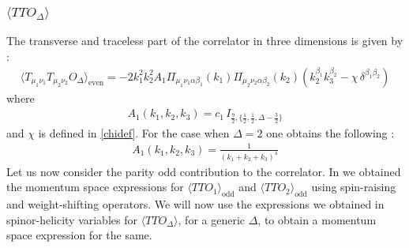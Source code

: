 \documentclass[a4paper,11pt]{article}
\begin{document}
\subsubsection*{$\langle TTO_{\Delta}\rangle$}
The transverse and traceless part of the correlator in three dimensions is given by \cite{Bzowski:2018fql}:
%
\begin{align}
 \langle T_{\mu_1 \nu_1}T_{\mu_2 \nu_2}O_{\Delta} \rangle_{\text{even}}=-2k_1^2k_2^2A_1\Pi_{\mu_1\nu_1\alpha\beta_1}(k_1)\Pi_{\mu_2\nu_2\alpha\beta_2}(k_2)(k_2^{\beta_1}k_3^{\beta_2}-\chi\,\delta^{\beta_1\beta_2})   
\end{align}
%
where
%
\begin{align}
\label{parityeventtoformfactor}
    A_1(k_1,k_2,k_3)=c_1\,I_{\frac 92,\{\frac 12,\frac 12,\Delta-\frac{3}{2}\}}
\end{align}
%
and $\chi$ is defined in \eqref{chidef}. For the case when $\Delta=2$ one obtains the following :
%
\begin{align}
A_1(k_1,k_2,k_3)=\frac{1}{(k_1+k_2+k_3)^4}
\end{align}
%
Let us now consider the parity odd contribution to the correlator. In \cite{Jain:2021wyn} we obtained the momentum space expressions for $\langle TTO_1 \rangle_{\text{odd}}$ and $\langle TTO_2 \rangle_{\text{odd}}$ using spin-raising and weight-shifting operators. We will now use the expressions we obtained in spinor-helicity variables  for $\langle TTO_{\Delta}\rangle$, for a generic $\Delta$, to obtain a momentum space expression for the same.
\end{document}
